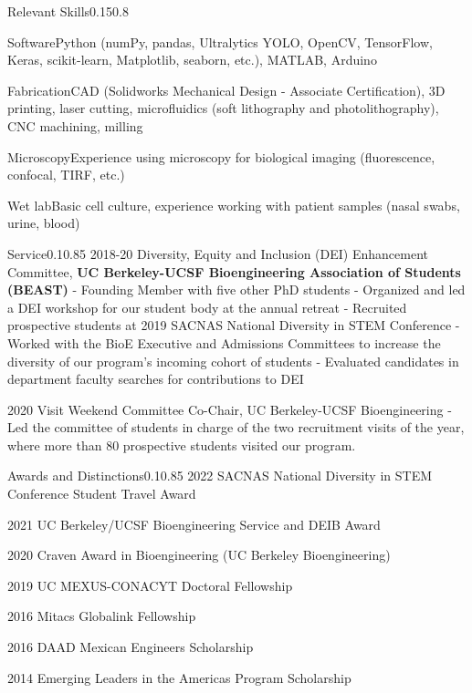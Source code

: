 \documentclass{federico_cv}
\begin{document}
\begin{tblSection}{Relevant Skills}{0.15}{0.8}

    \skill
    {Software}{Python (numPy, pandas, Ultralytics YOLO, OpenCV, TensorFlow, Keras, scikit-learn, Matplotlib, seaborn, etc.), MATLAB, Arduino}

    \skill
    {Fabrication}{CAD (Solidworks Mechanical Design - Associate Certification), 3D printing, laser cutting, microfluidics (soft lithography and photolithography), CNC machining, milling}
    
    \skill
    {Microscopy}{Experience using microscopy for biological imaging (fluorescence, confocal, TIRF, etc.)}

    \skill
    {Wet lab}{Basic cell culture, experience working with patient samples (nasal swabs, urine, blood)}


\end{tblSection}


\begin{tblSection}{Service}{0.1}{0.85}
\leftbfrightsingle
{2018-20}
{Diversity, Equity and Inclusion (DEI) Enhancement Committee,}
{\textbf{UC Berkeley-UCSF Bioengineering Association of Students (BEAST)}}
{- Founding Member with five other PhD students}
{- Organized and led a DEI workshop for our student body at the annual retreat}
{- Recruited prospective students at 2019 SACNAS National Diversity in STEM Conference}
{- Worked with the BioE Executive and Admissions Committees to increase the diversity of our program's incoming cohort of students}
{- Evaluated candidates in department faculty searches for contributions to DEI}

\leftbfrightsingle
{2020}
{Visit Weekend Committee Co-Chair, UC Berkeley-UCSF Bioengineering}
{- Led the committee of students in charge of the two recruitment visits of the year, where more than 80 prospective students visited our program.}

\end{tblSection}


\begin{tblSection}{Awards and Distinctions}{0.1}{0.85}
\award
{2022}
{SACNAS National Diversity in STEM Conference Student Travel Award}

\award
{2021}
{UC Berkeley/UCSF Bioengineering Service and DEIB Award}

\award
{2020}
{Craven Award in Bioengineering (UC Berkeley Bioengineering)}

\award
{2019}
{UC MEXUS-CONACYT Doctoral Fellowship}

\award
{2016}
{Mitacs Globalink Fellowship}

\award
{2016}
{DAAD Mexican Engineers Scholarship}

\award
{2014}
{Emerging Leaders in the Americas Program Scholarship}

\end{tblSection}
\end{document}
